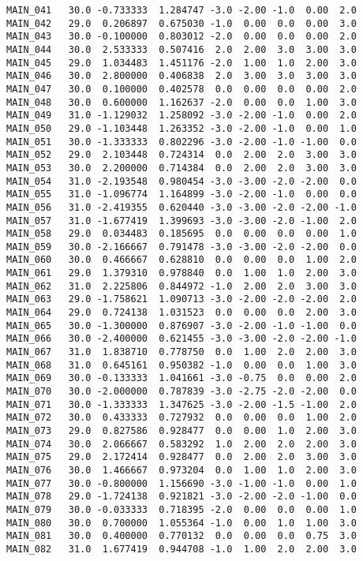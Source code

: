 \documentclass[a4paper,10pt,onecolumn,oneside,openright]{article}
\begin{document}
\begin{verbatim}
MAIN_041   30.0 -0.733333  1.284747 -3.0 -2.00 -1.0  0.00  2.0
MAIN_042   29.0  0.206897  0.675030 -1.0  0.00  0.0  0.00  3.0
MAIN_043   30.0 -0.100000  0.803012 -2.0  0.00  0.0  0.00  2.0
MAIN_044   30.0  2.533333  0.507416  2.0  2.00  3.0  3.00  3.0
MAIN_045   29.0  1.034483  1.451176 -2.0  1.00  1.0  2.00  3.0
MAIN_046   30.0  2.800000  0.406838  2.0  3.00  3.0  3.00  3.0
MAIN_047   30.0  0.100000  0.402578  0.0  0.00  0.0  0.00  2.0
MAIN_048   30.0  0.600000  1.162637 -2.0  0.00  0.0  1.00  3.0
MAIN_049   31.0 -1.129032  1.258092 -3.0 -2.00 -1.0  0.00  2.0
MAIN_050   29.0 -1.103448  1.263352 -3.0 -2.00 -1.0  0.00  1.0
MAIN_051   30.0 -1.333333  0.802296 -3.0 -2.00 -1.0 -1.00  0.0
MAIN_052   29.0  2.103448  0.724314  0.0  2.00  2.0  3.00  3.0
MAIN_053   30.0  2.200000  0.714384  0.0  2.00  2.0  3.00  3.0
MAIN_054   31.0 -2.193548  0.980454 -3.0 -3.00 -2.0 -2.00  0.0
MAIN_055   31.0 -1.096774  1.164899 -3.0 -2.00 -1.0  0.00  0.0
MAIN_056   31.0 -2.419355  0.620440 -3.0 -3.00 -2.0 -2.00 -1.0
MAIN_057   31.0 -1.677419  1.399693 -3.0 -3.00 -2.0 -1.00  2.0
MAIN_058   29.0  0.034483  0.185695  0.0  0.00  0.0  0.00  1.0
MAIN_059   30.0 -2.166667  0.791478 -3.0 -3.00 -2.0 -2.00  0.0
MAIN_060   30.0  0.466667  0.628810  0.0  0.00  0.0  1.00  2.0
MAIN_061   29.0  1.379310  0.978840  0.0  1.00  1.0  2.00  3.0
MAIN_062   31.0  2.225806  0.844972 -1.0  2.00  2.0  3.00  3.0
MAIN_063   29.0 -1.758621  1.090713 -3.0 -2.00 -2.0 -2.00  2.0
MAIN_064   29.0  0.724138  1.031523  0.0  0.00  0.0  2.00  3.0
MAIN_065   30.0 -1.300000  0.876907 -3.0 -2.00 -1.0 -1.00  0.0
MAIN_066   30.0 -2.400000  0.621455 -3.0 -3.00 -2.0 -2.00 -1.0
MAIN_067   31.0  1.838710  0.778750  0.0  1.00  2.0  2.00  3.0
MAIN_068   31.0  0.645161  0.950382 -1.0  0.00  0.0  1.00  3.0
MAIN_069   30.0 -0.133333  1.041661 -3.0 -0.75  0.0  0.00  2.0
MAIN_070   30.0 -2.000000  0.787839 -3.0 -2.75 -2.0 -2.00  0.0
MAIN_071   30.0 -1.333333  1.347625 -3.0 -2.00 -1.5 -1.00  2.0
MAIN_072   30.0  0.433333  0.727932  0.0  0.00  0.0  1.00  2.0
MAIN_073   29.0  0.827586  0.928477  0.0  0.00  1.0  2.00  3.0
MAIN_074   30.0  2.066667  0.583292  1.0  2.00  2.0  2.00  3.0
MAIN_075   29.0  2.172414  0.928477  0.0  2.00  2.0  3.00  3.0
MAIN_076   30.0  1.466667  0.973204  0.0  1.00  1.0  2.00  3.0
MAIN_077   30.0 -0.800000  1.156690 -3.0 -1.00 -1.0  0.00  1.0
MAIN_078   29.0 -1.724138  0.921821 -3.0 -2.00 -2.0 -1.00  0.0
MAIN_079   30.0 -0.033333  0.718395 -2.0  0.00  0.0  0.00  1.0
MAIN_080   30.0  0.700000  1.055364 -1.0  0.00  1.0  1.00  3.0
MAIN_081   30.0  0.400000  0.770132  0.0  0.00  0.0  0.75  3.0
MAIN_082   31.0  1.677419  0.944708 -1.0  1.00  2.0  2.00  3.0

\end{verbatim}
\end{document}

